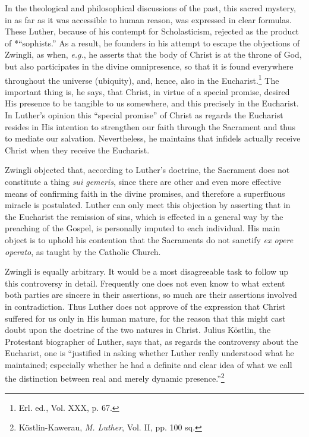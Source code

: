 In the theological and philosophical discussions of the past, this
sacred mystery, in as far as it was accessible to human reason, was
expressed in clear formulas. These Luther, because of his contempt for
Scholasticism, rejected as the product of *“sophists.” As a result, he
founders in his attempt to escape the objections of Zwingli, as when,
\textit{e.g.}, he asserts that the body of Christ is at the throne of God, but
also participates in the divine omnipresence, so that it is found everywhere
throughout the universe (ubiquity), and, hence, also in the
Eucharist.\footnote{Erl. ed., Vol. XXX, p. 67.}
The important thing is, he says, that Christ, in virtue of a
special promise, desired His presence to be tangible to us somewhere,
and this precisely in the Eucharist. In Luther’s opinion this “special
promise” of Christ as regards the Eucharist resides in His intention
to strengthen our faith through the Sacrament and thus to mediate
our salvation. Nevertheless, he maintains that infidels actually receive
Christ when they receive the Eucharist.

Zwingli objected that, according to Luther’s doctrine, the Sacrament does
not constitute a thing \textit{sui gemeris}, since there are other
and even more effective means of confirming faith in the divine
promises, and therefore a superfluous miracle is postulated. Luther
can only meet this objection by asserting that in the Eucharist the
remission of sins, which is effected in a general way by the preaching
of the Gospel, is personally imputed to each individual. His main
object is to uphold his contention that the Sacraments do not
sanctify \textit{ex opere operato}, as taught by the Catholic Church.

Zwingli is equally arbitrary. It would be a most disagreeable task
to follow up this controversy in detail. Frequently one does not
even know to what extent both parties are sincere in their assertions,
so much are their assertions involved in contradiction. Thus
Luther does not approve of the expression that Christ suffered for
us only in His human mature, for the reason that this might cast
doubt upon the doctrine of the two natures in Christ. Julius
Köstlin, the Protestant biographer of Luther, says that, as regards
the controversy about the Eucharist, one is “justified in asking
whether Luther really understood what he maintained; especially
whether he had a definite and clear idea of what we call the distinction
between real and merely dynamic presence.”\footnote{Köstlin-Kawerau, \textit{M. Luther}, Vol. II, pp. 100 sq.}

